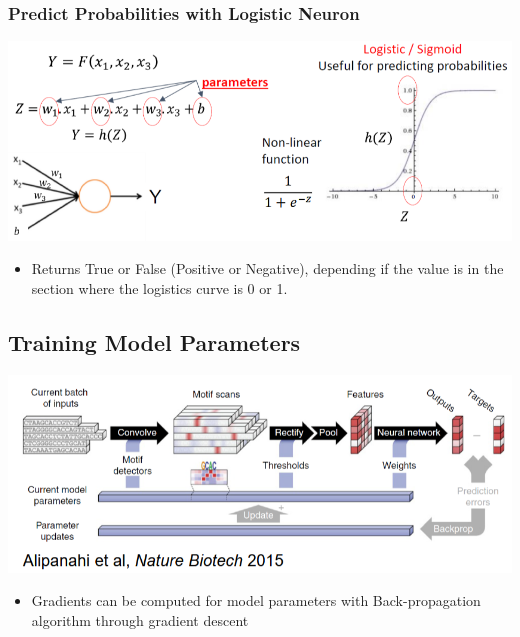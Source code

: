 \documentclass[10pt]{article}
\begin{document}
\subsubsection*{Predict Probabilities with Logistic Neuron}
\begin{center} 
	\includegraphics*[width=\textwidth]{W8_20.png} 
\end{center}
\begin{itemize}
	\item Returns True or False (Positive or Negative), depending if the value is in the section where the logistics curve is 0 or 1.
\end{itemize}

\subsection*{Training Model Parameters}
\begin{center} 
	\includegraphics*[width=\textwidth]{W8_21.png} 
\end{center}
\begin{itemize}
	\item Gradients can be computed for model parameters with Back-propagation algorithm through gradient descent
\end{itemize}
\end{document}
